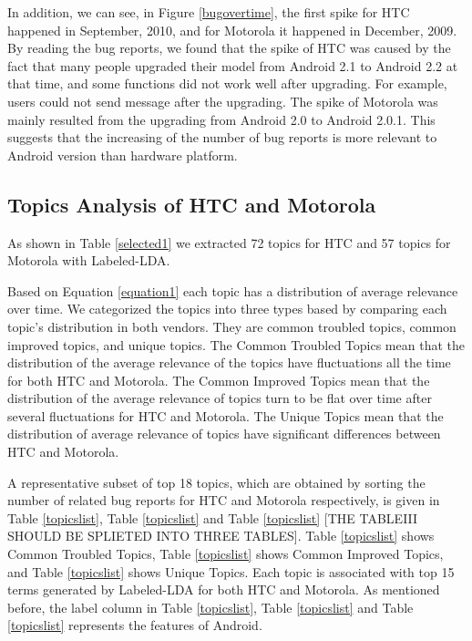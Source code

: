 \documentclass[10pt, conference, compsocconf]{IEEEtran}
\begin{document}
In addition, we can see, in Figure \ref{bugovertime}, the first spike for HTC happened in September, 2010, and for Motorola it happened in December, 2009. By reading the bug reports, we found that the spike of HTC was caused by the fact that many people upgraded their model from Android 2.1 to Android 2.2 at that time, and some functions did not work well after upgrading. For example, users could not send message after the upgrading. The spike of Motorola was mainly resulted from the upgrading from Android 2.0 to Android 2.0.1. This suggests that the increasing of the number of bug reports is more relevant to Android version than hardware platform.


\subsection{Topics Analysis of HTC and Motorola}

As shown in Table \ref{selected1} we extracted 72 topics for HTC and 57 topics for Motorola with Labeled-LDA.

Based on Equation \ref{equation1} each topic has a distribution of average relevance over time. We categorized the topics into three types based by comparing each topic's distribution in both vendors. They are common troubled topics, common improved topics, and unique
topics. 
The Common Troubled Topics mean that the distribution of the average relevance of the topics have fluctuations all the time for both HTC and Motorola. The Common Improved Topics mean that the distribution of the average relevance of topics turn to be flat over time after several fluctuations for HTC and Motorola. The Unique Topics mean that the distribution of average relevance of topics have significant differences between HTC and Motorola.

A representative subset of top 18 topics, which are obtained by
sorting the number of related bug reports for HTC and Motorola
respectively, is given in Table \ref{topicslist}, Table \ref{topicslist}
and Table \ref{topicslist} [THE TABLEIII SHOULD BE SPLIETED INTO THREE
TABLES]. 
Table \ref{topicslist} shows Common Troubled Topics,
Table \ref{topicslist} shows Common Improved Topics, and
Table \ref{topicslist} shows Unique Topics. 
Each topic is associated with top 15 terms generated by Labeled-LDA for
both HTC and Motorola. 
As mentioned before, the label column in Table \ref{topicslist}, Table \ref{topicslist} and Table \ref{topicslist} represents the features of Android. %
\end{document}

